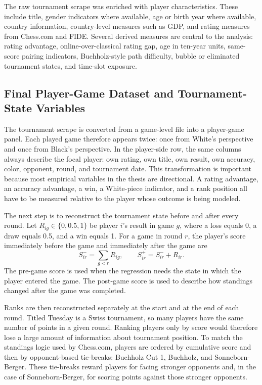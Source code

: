 The raw tournament scrape was enriched with player characteristics. These include title, gender indicators where available, age or birth year where available, country information, country-level measures such as GDP, and rating measures from Chess.com and FIDE. Several derived measures are central to the analysis: rating advantage, online-over-classical rating gap, age in ten-year units, same-score pairing indicators, Buchholz-style path difficulty, bubble or eliminated tournament states, and time-slot exposure.

\subsection{Final Player-Game Dataset and Tournament-State Variables}

The tournament scrape is converted from a game-level file into a player-game panel. Each played game therefore appears twice: once from White's perspective and once from Black's perspective. In the player-side row, the same columns always describe the focal player: own rating, own title, own result, own accuracy, color, opponent, round, and tournament date. This transformation is important because most empirical variables in the thesis are directional. A rating advantage, an accuracy advantage, a win, a White-piece indicator, and a rank position all have to be measured relative to the player whose outcome is being modeled.

The next step is to reconstruct the tournament state before and after every round. Let \(R_{ig}\in\{0,0.5,1\}\) be player \(i\)'s result in game \(g\), where a loss equals 0, a draw equals 0.5, and a win equals 1. For a game in round \(r\), the player's score immediately before the game and immediately after the game are
\[
S_{ir}^{-}=\sum_{g<r}R_{ig},
\qquad
S_{ir}^{+}=S_{ir}^{-}+R_{ir}.
\]
The pre-game score is used when the regression needs the state in which the player entered the game. The post-game score is used to describe how standings changed after the game was completed.

Ranks are then reconstructed separately at the start and at the end of each round. Titled Tuesday is a Swiss tournament, so many players have the same number of points in a given round. Ranking players only by score would therefore lose a large amount of information about tournament position. To match the standings logic used by Chess.com, players are ordered by cumulative score and then by opponent-based tie-breaks: Buchholz Cut 1, Buchholz, and Sonneborn-Berger. These tie-breaks reward players for facing stronger opponents and, in the case of Sonneborn-Berger, for scoring points against those stronger opponents.

